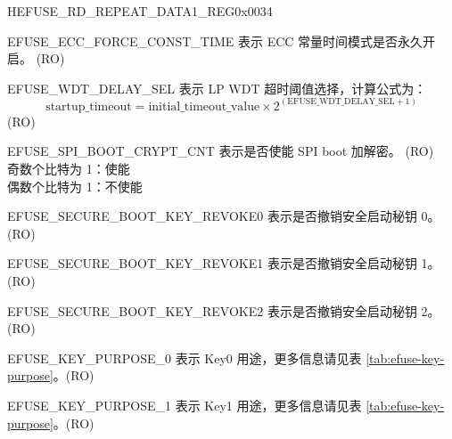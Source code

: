 \begin{register}{H}{EFUSE\_RD\_REPEAT\_DATA1\_REG}{0x0034}
\begin{regdesc}
\begin{reglist}
\label{fielddesc:EFUSEECCFORCECONSTTIME}\item [EFUSE\_ECC\_FORCE\_CONST\_TIME] 表示 ECC 常量时间模式是否永久开启。 (RO)
\label{fielddesc:EFUSEWDTDELAYSEL}\item [EFUSE\_WDT\_DELAY\_SEL] 表示 LP WDT 超时阈值选择，计算公式为：
\[
    \text{startup\_timeout} = \text{initial\_timeout\_value} \times 2^{(\text{EFUSE\_WDT\_DELAY\_SEL} + 1)}
    \]
(RO)
\label{fielddesc:EFUSESPIBOOTCRYPTCNT}\item [EFUSE\_SPI\_BOOT\_CRYPT\_CNT] 表示是否使能 SPI boot 加解密。 (RO)\\奇数个比特为 1：使能\\偶数个比特为 1：不使能
\label{fielddesc:EFUSESECUREBOOTKEYREVOKE0}\item [EFUSE\_SECURE\_BOOT\_KEY\_REVOKE0] 表示是否撤销安全启动秘钥 0。 (RO)
\label{fielddesc:EFUSESECUREBOOTKEYREVOKE1}\item [EFUSE\_SECURE\_BOOT\_KEY\_REVOKE1] 表示是否撤销安全启动秘钥 1。 (RO)
\label{fielddesc:EFUSESECUREBOOTKEYREVOKE2}\item [EFUSE\_SECURE\_BOOT\_KEY\_REVOKE2] 表示是否撤销安全启动秘钥 2。 (RO)
\label{fielddesc:EFUSEKEYPURPOSE0}\item [EFUSE\_KEY\_PURPOSE\_0] 表示 Key0 用途，更多信息请见表 \ref{tab:efuse-key-purpose}。(RO)
\label{fielddesc:EFUSEKEYPURPOSE1}\item [EFUSE\_KEY\_PURPOSE\_1] 表示 Key1 用途，更多信息请见表 \ref{tab:efuse-key-purpose}。(RO)
\end{reglist}\end{regdesc}
\end{register}


